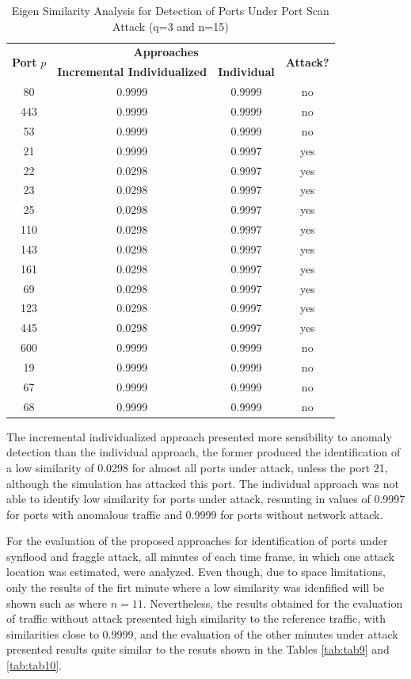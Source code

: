 \begin{table}[h!]
  \centering
  \caption{Eigen Similarity Analysis for Detection of Ports Under Port Scan Attack (q=3 and n=15)}
  \label{tab:tab8}
  \begin{tabular}{ c c c c }
	\toprule
	\multirow{2}{*}{\textbf{Port} $p$}   &\multicolumn{2}{c}{\textbf{Approaches}} &\multirow{2}{*}{\textbf{Attack?}}\\ 
			\hhline{~--~}
			&\textbf{Incremental Individualized} &\textbf{Individual}\\
	\midrule
	80 &0.9999 &0.9999 &no \\
	443 &0.9999 &0.9999 &no \\
	53 &0.9999 &0.9999 &no \\
	21 &0.9999 &0.9997 &yes \\
	22 &0.0298 &0.9997 &yes \\
	23 &0.0298 &0.9997 &yes \\
	25 &0.0298 &0.9997 &yes \\
	110 &0.0298 &0.9997 &yes \\
	143 &0.0298 &0.9997 &yes \\
	161 &0.0298 &0.9997 &yes \\
	69 &0.0298 &0.9997 &yes \\
	123 &0.0298 &0.9997 &yes \\
	445 &0.0298 &0.9997 &yes \\
	600 &0.9999 &0.9999 &no \\
	19 &0.9999 &0.9999 &no \\
	67 &0.9999 &0.9999 &no \\
	68 &0.9999 &0.9999 &no \\
    \bottomrule
  \end{tabular}
\end{table}

The incremental individualized approach presented more sensibility to anomaly detection than the individual approach, the former produced the identification of a low similarity of 0.0298 for almost all ports under attack, unless the port 21, although the simulation has attacked this port. The individual approach was not able to identify low similarity for ports under attack, resunting in values of 0.9997 for ports with anomalous traffic and 0.9999 for ports without network attack.

For the evaluation of the proposed approaches for identification of ports under synflood and fraggle attack, all minutes of each time frame, in which one attack location was estimated, were analyzed. Even though, due to space limitations, only the results of the firt minute where a low similarity was idenfified will be shown such as where $n=11$. Nevertheless, the results obtained for the evaluation of traffic without attack presented high similarity to the reference traffic, with similarities close to 0.9999, and the evaluation of the other minutes under attack presented results quite similar to the resuts shown in the Tables \ref{tab:tab9} and \ref{tab:tab10}.

